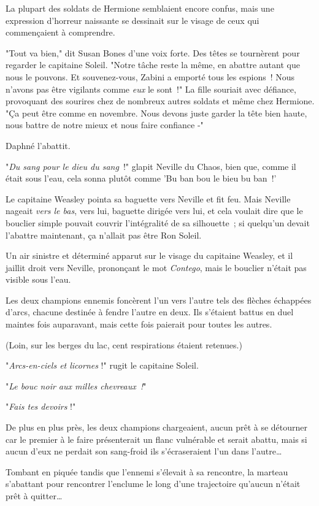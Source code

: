 La plupart des soldats de Hermione semblaient encore confus, mais une expression d'horreur naissante se dessinait sur le visage de ceux qui commençaient à comprendre.

"Tout va bien," dit Susan Bones d'une voix forte. Des têtes se tournèrent pour regarder le capitaine Soleil. "Notre tâche reste la même, en abattre autant que nous le pouvons. Et souvenez-vous, Zabini a emporté tous les espions~! Nous n'avons pas être vigilants comme \emph{eux} le sont~!" La fille souriait avec défiance, provoquant des sourires chez de nombreux autres soldats et même chez Hermione. "Ça peut être comme en novembre. Nous devons juste garder la tête bien haute, nous battre de notre mieux et nous faire confiance -"

Daphné l'abattit.

\later

"\emph{Du sang pour le dieu du sang}~!" glapit Neville du Chaos, bien que, comme il était sous l'eau, cela sonna plutôt comme 'Bu ban bou le bieu bu ban~!'

Le capitaine Weasley pointa sa baguette vers Neville et fit feu. Mais Neville nageait \emph{vers le bas}, vers lui, baguette dirigée vers lui, et cela voulait dire que le bouclier simple pouvait couvrir l'intégralité de sa silhouette~; si quelqu'un devait l'abattre maintenant, ça n'allait pas être Ron Soleil.

Un air sinistre et déterminé apparut sur le visage du capitaine Weasley, et il jaillit droit vers Neville, prononçant le mot \emph{Contego}, mais le bouclier n'était pas visible sous l'eau.

Les deux champions ennemis foncèrent l'un vers l'autre tels des flèches échappées d'arcs, chacune destinée à fendre l'autre en deux. Ils s'étaient battus en duel maintes fois auparavant, mais cette fois paierait pour toutes les autres.

(Loin, sur les berges du lac, cent respirations étaient retenues.)

"\emph{Arcs-en-ciels et licornes} !" rugit le capitaine Soleil.

"\emph{Le bouc noir aux milles chevreaux~!}"

"\emph{Fais tes devoirs} !"

De plus en plus près, les deux champions chargeaient, aucun prêt à se détourner car le premier à le faire présenterait un flanc vulnérable et serait abattu, mais si aucun d'eux ne perdait son sang-froid ils s'écraseraient l'un dans l'autre…

Tombant en piquée tandis que l'ennemi s'élevait à sa rencontre, la marteau s'abattant pour rencontrer l'enclume le long d'une trajectoire qu'aucun n'était prêt à quitter…


